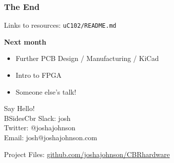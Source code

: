 \documentclass[t]{beamer}
\begin{document}

\begin{frame}
\frametitle{The End}
Links to resources: \texttt{uC102/README.md}
\vspace{5mm}

\textbf{Next month}
\begin{itemize}
	\item Further PCB Design / Manufacturing / KiCad
	\item Intro to FPGA
	\item Someone else's talk!
\end{itemize}

\vspace{5mm}
Say Hello! \\
BSidesCbr Slack: josh\\
Twitter:  @\textunderscore joshajohnson\\
Email: josh@joshajohnson.com\\
\vspace{4mm}

Project Files: \url{github.com/joshajohnson/CBRhardware}\\
\end{frame}
\end{document}
